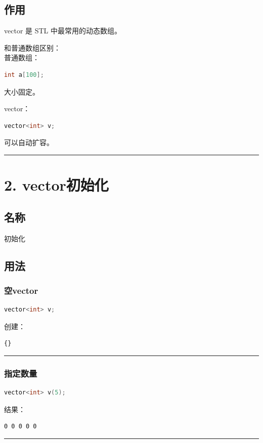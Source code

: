 \documentclass[9pt,twocolumn]{extarticle}
\begin{document}
\subsection{作用}
vector 是 STL 中最常用的动态数组。

和普通数组区别：\\
普通数组：
\begin{lstlisting}[language=C++]
int a[100];
\end{lstlisting}
大小固定。

vector：
\begin{lstlisting}[language=C++]
vector<int> v;
\end{lstlisting}
可以自动扩容。

\noindent\rule{\linewidth}{0.4pt}

\section{2. vector初始化}

\subsection{名称}
初始化

\subsection{用法}

\subsubsection{空vector}
\begin{lstlisting}[language=C++]
vector<int> v;
\end{lstlisting}
创建：
\begin{lstlisting}
{}
\end{lstlisting}

\noindent\rule{\linewidth}{0.4pt}

\subsubsection{指定数量}
\begin{lstlisting}[language=C++]
vector<int> v(5);
\end{lstlisting}
结果：
\begin{lstlisting}
0 0 0 0 0
\end{lstlisting}

\noindent\rule{\linewidth}{0.4pt}
\end{document}
